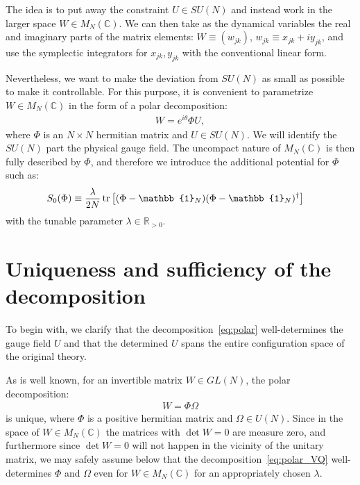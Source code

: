 \documentclass[12pt]{article}
\begin{document}
The idea is to put away the constraint $U \in SU(N)$
and instead work in the larger space $W \in M_N(\mathbb{C})$.
We can then take as the dynamical variables the real and imaginary parts
of the matrix elements:
$W \equiv (w_{jk})$, $w_{jk} \equiv x_{jk}+iy_{jk}$,
and use the symplectic integrators
for $x_{jk}, y_{jk}$ with the conventional linear form.

Nevertheless, we want to make the deviation
from $SU(N)$ as small as possible
to make it controllable.
For this purpose, it is convenient to parametrize $W \in M_N(\mathbb{C})$
in the form of a polar decomposition:
\begin{align}
  W = e^{i\theta} \Phi U,
  \label{eq:polar}
\end{align}
where $\Phi$ is an $N\times N$ hermitian matrix and $U \in SU(N)$.
We will identify the $SU(N)$ part the physical gauge field.
The uncompact nature of $M_N(\mathbb{C})$ is then fully described by $\Phi$,
and therefore we introduce the additional potential
for $\Phi$ such as:
\begin{align}
  S_0(\Phi)
  & \equiv
    \frac{\lambda}{2N} \,
    {\rm tr} \,
    \big[
    (\Phi-\mathbb{1}_N)(\Phi-\mathbb{1}_N)^\dagger
    \big]
    \label{eq:s0}
\end{align}
with the tunable parameter $\lambda \in \mathbb{R}_{>0}$.


\section{Uniqueness and sufficiency of the decomposition}
\label{sec:polar}

To begin with,
we clarify that the decomposition~\eqref{eq:polar}
well-determines the gauge field $U$ and
that the determined $U$ spans the entire configuration space
of the original theory.

As is well known, for an invertible matrix $W \in GL(N)$,
the polar decomposition:
\begin{align}
  W = \Phi \Omega
  \label{eq:polar_VQ}
\end{align}
is unique, where $\Phi$ is
a positive hermitian matrix and $\Omega \in U(N)$.
Since in the space of $W \in M_N(\mathbb{C})$
the matrices with $\det W=0$ are measure zero,
and furthermore since $\det W=0$ will not
happen in the vicinity of the unitary matrix,
we may safely assume below
that the decomposition~\eqref{eq:polar_VQ}
well-determines $\Phi$ and $\Omega$
even for $W \in M_N(\mathbb{C})$
for an appropriately chosen $\lambda$.
\end{document}
